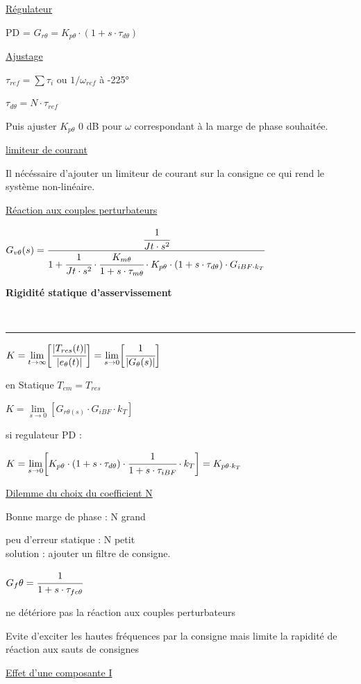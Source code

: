 \documentclass[	DIV=calc,%
							paper=a4,%
							fontsize=10pt,%
							twocolumn]{scrartcl} %
\newcounter{mycounter}
\newcommand{\formdesc}[1]{\large\textbf{#1} \addtocounter{mycounter}{1} \hfill \themycounter \\ \vspace{-3mm} \hrule \vspace{2mm}}
\begin{document}
\underline{Régulateur}

PD = $G_{r\theta} = K_{p\theta} \cdot (1+s\cdot\tau_{d\theta})$

\underline{Ajustage}

$\tau_{ref} = \sum\tau_i \text{ ou } 1/\omega_{ref} $ à -225°

$\tau_{d\theta} = N \cdot \tau_{ref}$

Puis ajuster $K_{p\theta}$ 0 dB pour $\omega$
correspondant à la marge de phase souhaitée.

\underline{limiteur de courant}

Il nécéssaire d'ajouter un limiteur de courant sur la consigne ce qui rend le système non-linéaire.


\underline{Réaction aux couples perturbateurs}

\resizebox{.5\textwidth}{!}
{
$G_{v\theta}(s) = \cfrac{\cfrac{1}{Jt \cdot s^2}}{1+\cfrac{1}{Jt \cdot s^2}\cdot \cfrac{K_{m\theta}}{1+s\cdot\tau_{m\theta}} \cdot K_{p\theta} \cdot (1+s\cdot\tau_{d\theta}) \cdot G_{iBF\cdot k_T}}$
}
\newpage


\formdesc{Rigidité statique d’asservissement}

$K = \lim\limits_{t \rightarrow \infty} \biggl[\cfrac{|T_{res}(t)|}{|e_\theta(t)|}\biggr] = \lim\limits_{s \rightarrow 0} \biggl[\cfrac{1}{|G_{\theta}(s)|}\biggr]$

en Statique 
$T_{em} = T_{res}$

$K = \lim\limits_{s \rightarrow 0}[G_{r\theta(s)}\cdot G_{iBF}\cdot k_T]$

si regulateur PD : 

$K = \lim\limits_{s \rightarrow 0}\biggl[K_{p\theta} \cdot (1+s\cdot\tau_{d\theta}) \cdot \cfrac{1}{1+s\cdot\tau_{iBF}} \cdot k_T\biggr] = K_{p\theta \cdot k_T}$

\underline{Dilemme du choix du coefficient N}

Bonne marge de phase : N grand

peu d'erreur statique : N petit \\

solution : ajouter un filtre de consigne.

$G_f\theta = \cfrac{1}{1+s\cdot\tau_{fc\theta}}$

ne détériore pas la réaction aux couples perturbateurs

Evite d'exciter les hautes fréquences par la consigne mais limite la rapidité de réaction aux sauts de consignes

\underline{Effet d’une composante I}
\end{document}
